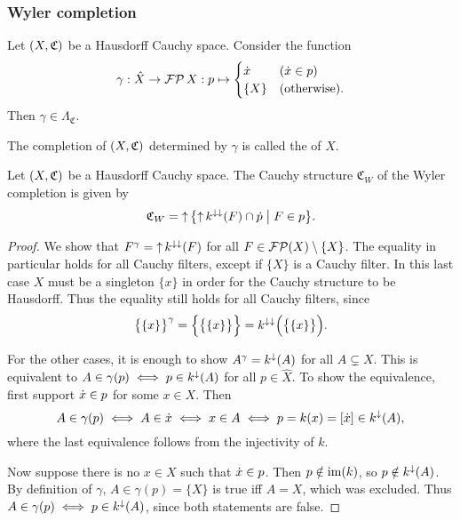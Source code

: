 \subsubsection{Wyler completion}
\begin{lemma}
Let $\sSet{X, \mathfrak{C}}$ be a Hausdorff Cauchy space. Consider the function
\[ \gamma: \hat{X} \to \operatorname{\mathcal{FP}}{X}: p \mapsto \begin{cases}
\dot{x} & (\dot{x}\in p) \\
\{X\} & (\text{otherwise}).
\end{cases} \]
Then $\gamma \in \Lambda_\mathfrak{C}$.
\end{lemma}
\begin{definition}
The completion of $\sSet{X, \mathfrak{C}}$ determined by $\gamma$ is called the  of $X$.
\end{definition}
\begin{lemma}
Let $\sSet{X, \mathfrak{C}}$ be a Hausdorff Cauchy space. The Cauchy structure $\mathfrak{C}_W$ of the Wyler completion is given by
\[ \mathfrak{C}_W = \upset \setbuilder{\upset k^{\imf\imf}(F) \cap \pfilter{p}}{F\in p}.  \]
\end{lemma}
\begin{proof}
We show that $F^\gamma = \operatorname{\uparrow} k^{\downarrow\downarrow}(F)$ for all $F\in \operatorname{\mathcal{FP}}(X)\setminus \{X\}$. The equality in particular holds for all Cauchy filters, except if $\{X\}$ is a Cauchy filter. In this last case $X$ must be a singleton $\{x\}$ in order for the Cauchy structure to be Hausdorff. Thus the equality still holds for all Cauchy filters, since
\[ \big\{\{x\}\big\}^\gamma = \Big\{\big\{\{x\}\big\}\Big\} = k^{\downarrow\downarrow}\Big(\big\{\{x\}\big\}\Big). \]

For the other cases, it is enough to show $A^\gamma = k^\downarrow(A)$ for all $A\subsetneq X$. This is equivalent to $A\in \gamma(p) \iff p\in k^{\downarrow}(A)$ for all $p\in \hat{X}$. To show the equivalence, first support $\dot{x} \in p$ for some $x\in X$. Then
\[ A\in \gamma(p) \iff A\in \dot{x} \iff x\in A \iff p = k(x) = [\dot{x}] \in k^\downarrow(A), \]
where the last equivalence follows from the injectivity of $k$.

Now suppose there is no $x\in X$ such that $\dot{x} \in p$. Then $p\notin \operatorname{im}(k)$, so $p\notin k^\downarrow(A)$. By definition of $\gamma$, $A\in \gamma(p) = \{X\}$ is true iff $A = X$, which was excluded. Thus $A\in \gamma(p) \iff p\in k^{\downarrow}(A)$, since both statements are false.
\end{proof}

